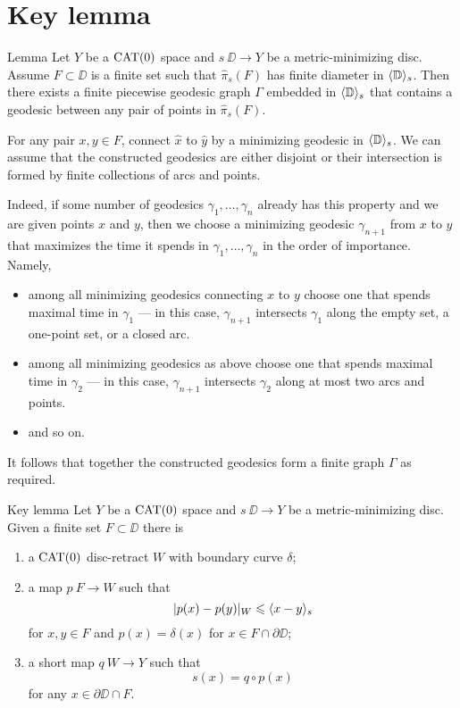 \section{Key lemma}\label{Key Lemma}


\begin{thm}{Lemma}\label{lem:graph}
Let $Y$ be a $\mathop{\rm CAT}\nolimits(0)$ space and $s\:\DD\to Y$ 
be a metric-minimizing disc.
Assume $F\subset \DD$ is a finite set such that $\hat\pi_s(F)$ has finite
diameter in $\langle\mathbb{D}\rangle_s$.
Then there exists a finite piecewise geodesic graph $\Gamma$ embedded in $\langle\mathbb{D}\rangle_s$ that contains a geodesic between any pair of points in $\hat\pi_s(F)$.
\end{thm} 

For any pair $x,y\in F$, connect $\hat x$ to $\hat y$ by a minimizing geodesic in $\langle\mathbb{D}\rangle_s$. 
We can assume that the constructed geodesics 
are either disjoint or their intersection is formed by finite collections of arcs and points.

Indeed, if some number of geodesics $\gamma_1,\dots,\gamma_n$ already has this property and we are given points $x$ and $y$, then
we choose a minimizing geodesic $\gamma_{n+1}$ from $x$ to $y$ that maximizes the time it spends in $\gamma_1,\dots,\gamma_n$  
in the order of importance.
Namely, 
\begin{itemize}
\item  among all minimizing geodesics connecting $x$ to $y$
choose one that spends maximal time in $\gamma_1$ --- in this case, $\gamma_{n+1}$ intersects $\gamma_1$ along the empty set, 
a one-point set, or a closed arc.
\item among all minimizing geodesics as above
choose one that spends maximal time in $\gamma_2$ --- in this case, $\gamma_{n+1}$ intersects $\gamma_2$ along at most two arcs and points.
\item and so on.
\end{itemize}

It follows that together the constructed geodesics form a finite graph $\Gamma$ as required.
\qeds



\begin{thm}{Key lemma}\label{lem:key}
Let $Y$ be a $\mathop{\rm CAT}\nolimits(0)$ space and $s\:\DD\to Y$ 
be a metric-minimizing disc.
Given a finite set $F\subset \DD$
there is 
\begin{enumerate}[(1)]
	\item a $\mathop{\rm CAT}\nolimits(0)$ disc-retract $W$ with boundary curve $\delta$;
	\item a map $p\:F\to W$ such that
\[|p(x)-p(y)|_W\leqslant \langle x-y\rangle_s\] 
for $x,y\in F$ and $p(x)=\delta(x)$ for $x\in F\cap \partial\DD$;
  \item a short map $q\:W\to Y$ such that
\[s(x)=q\circ p(x)\] 
for any $x\in\partial\DD\cap F$.
\end{enumerate}
 
\end{thm} 

